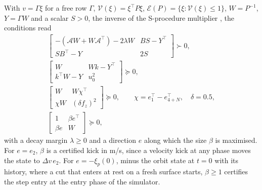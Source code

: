 With $v=\Gamma\xi$ for a free row $\Gamma$, $\mathcal V(\xi)=\xi^\top P\xi$, $\mathcal E(P)=\{\xi:\mathcal V(\xi)\le1\}$, $W=P^{-1}$, $Y=\Gamma W$ and a scalar $S>0$, the inverse of the S-procedure multiplier \citep{tarbouriech2009antiwindup,tarbouriech2011book}, the conditions read
\begin{gather}
\begin{bmatrix}-(\mathcal AW+W\mathcal A^\top)-2\lambda W & BS-Y^\top\\ SB^\top-Y & 2S\end{bmatrix}\succ0, \label{eq:lmi-dec}\\
\begin{bmatrix}W & Wk-Y^\top\\ k^\top W-Y & u_0^2\end{bmatrix}\succeq0, \label{eq:lmi-incl}\\
\begin{bmatrix}W & W\chi^\top\\ \chi W & (\delta f_z)^2\end{bmatrix}\succeq0,\qquad \chi=e_1^\top-e_{4+N}^\top,\quad \delta=0.5, \label{eq:lmi-valid}\\
\begin{bmatrix}1 & \beta e^\top\\ \beta e & W\end{bmatrix}\succeq0, \label{eq:lmi-size}
\end{gather}
with a decay margin $\lambda\ge0$ and a direction $e$ along which the size $\beta$ is maximised. For $e=e_2$, $\beta$ is a certified kick in m/s, since a velocity kick at any phase moves the state to $\Delta v\,e_2$. For $e=-\xi_p(0)$, minus the orbit state at $t=0$ with its history, where a cut that enters at rest on a fresh surface starts, $\beta\ge1$ certifies the step entry at the entry phase of the simulator.

